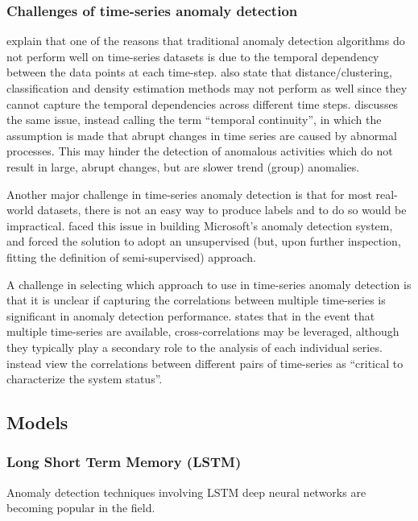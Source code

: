 \documentclass{mproj}
\begin{document}
\subsubsection{Challenges of time-series anomaly detection}

\cite{deepMultivariateNetwork} explain that one of the reasons that traditional anomaly detection algorithms do not perform well on time-series datasets is due to the temporal dependency between the data points at each time-step. \cite{deepMultivariateNetwork} also state that distance/clustering, classification and density estimation methods may not perform as well since they cannot capture the temporal dependencies across different time steps. \cite{outlierAnalysisBook} discusses the same issue, instead calling the term ``temporal continuity'', in which the assumption is made that abrupt changes in time series are caused by abnormal processes. This may hinder the detection of anomalous activities which do not result in large, abrupt changes, but are slower trend (group) anomalies.

Another major challenge in time-series anomaly detection is that for most real-world datasets, there is not an easy way to produce labels and to do so would be impractical. \cite{MicrosoftTimeSeries} faced this issue in building Microsoft's anomaly detection system, and forced the solution to adopt an unsupervised (but, upon further inspection, fitting the definition of semi-supervised) approach.

A challenge in selecting which approach to use in time-series anomaly detection is that it is unclear if capturing the correlations between multiple time-series is significant in anomaly detection performance. \cite{outlierAnalysisBook} states that in the event that multiple time-series are available, cross-correlations may be leveraged, although they typically play a secondary role to the analysis of each individual series. \cite{deepMultivariateNetwork} instead view the correlations between different pairs of time-series as ``critical to characterize the system status''.

\subsection{Models}
\subsubsection{Long Short Term Memory (LSTM)}

Anomaly detection techniques involving LSTM deep neural networks are becoming popular in the field.
\end{document}
